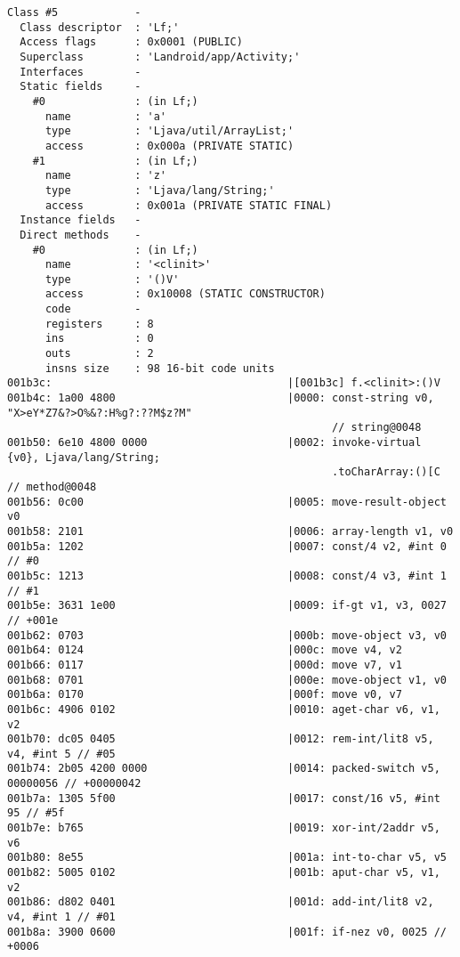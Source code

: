 \begin{lstlisting}
Class #5            -
  Class descriptor  : 'Lf;'
  Access flags      : 0x0001 (PUBLIC)
  Superclass        : 'Landroid/app/Activity;'
  Interfaces        -
  Static fields     -
    #0              : (in Lf;)
      name          : 'a'
      type          : 'Ljava/util/ArrayList;'
      access        : 0x000a (PRIVATE STATIC)
    #1              : (in Lf;)
      name          : 'z'
      type          : 'Ljava/lang/String;'
      access        : 0x001a (PRIVATE STATIC FINAL)
  Instance fields   -
  Direct methods    -
    #0              : (in Lf;)
      name          : '<clinit>'
      type          : '()V'
      access        : 0x10008 (STATIC CONSTRUCTOR)
      code          -
      registers     : 8
      ins           : 0
      outs          : 2
      insns size    : 98 16-bit code units
001b3c:                                     |[001b3c] f.<clinit>:()V
001b4c: 1a00 4800                           |0000: const-string v0, "X>eY*Z7&?>O%&?:H%g?:??M$z?M"
                                                   // string@0048
001b50: 6e10 4800 0000                      |0002: invoke-virtual {v0}, Ljava/lang/String;
                                                   .toCharArray:()[C // method@0048
001b56: 0c00                                |0005: move-result-object v0
001b58: 2101                                |0006: array-length v1, v0
001b5a: 1202                                |0007: const/4 v2, #int 0 // #0
001b5c: 1213                                |0008: const/4 v3, #int 1 // #1
001b5e: 3631 1e00                           |0009: if-gt v1, v3, 0027 // +001e
001b62: 0703                                |000b: move-object v3, v0
001b64: 0124                                |000c: move v4, v2
001b66: 0117                                |000d: move v7, v1
001b68: 0701                                |000e: move-object v1, v0
001b6a: 0170                                |000f: move v0, v7
001b6c: 4906 0102                           |0010: aget-char v6, v1, v2
001b70: dc05 0405                           |0012: rem-int/lit8 v5, v4, #int 5 // #05
001b74: 2b05 4200 0000                      |0014: packed-switch v5, 00000056 // +00000042
001b7a: 1305 5f00                           |0017: const/16 v5, #int 95 // #5f
001b7e: b765                                |0019: xor-int/2addr v5, v6
001b80: 8e55                                |001a: int-to-char v5, v5
001b82: 5005 0102                           |001b: aput-char v5, v1, v2
001b86: d802 0401                           |001d: add-int/lit8 v2, v4, #int 1 // #01
001b8a: 3900 0600                           |001f: if-nez v0, 0025 // +0006

\end{lstlisting}
